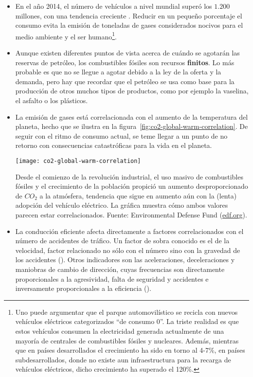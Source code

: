 \begin{itemize}
	\item En el año 2014, el número de vehículos a nivel mundial superó los $1.200$ millones, con una tendencia creciente \cite{oica2014motrate}. Reducir en un pequeño porcentaje el consumo evita la emisión de toneladas de gases considerados nocivos para el medio ambiente y el ser humano\footnote{Uno puede argumentar que el parque automovilístico se recicla con nuevos vehículos eléctricos categorizados \enquote{de consumo 0}. La triste realidad es que estos vehículos consumen la electricidad generada actualmente de una mayoría de centrales de combustibles fósiles y nucleares. Además, mientras que en países desarrollados el crecimiento ha sido en torno al 4-7\%, en países subdesarrollados, donde no existe aun infraestructura para la recarga de vehículos eléctricos, dicho crecimiento ha superado el 120\%.}.
	\item Aunque existen diferentes puntos de vista acerca de cuándo se agotarán las reservas de petróleo, los combustibles fósiles son recursos \textbf{finitos}. Lo más probable es que no se llegue a agotar debido a la ley de la oferta y la demanda, pero hay que recordar que el petróleo se usa como base para la producción de otros muchos tipos de productos, como por ejemplo la vaselina, el asfalto o los plásticos.
	\item La emisión de gases está correlacionada con el aumento de la temperatura del planeta, hecho que se ilustra en la figura~\ref{fig:co2-global-warm-correlation}. De seguir con el ritmo de consumo actual, se teme llegar a un punto de no retorno con consecuencias catastróficas para la vida en el planeta.

\begin{marginfigure}
	\centering
	\texttt{[image: co2-global-warm-correlation]}
	\caption[Relación entre la emisión de $CO_2$ a la atmósfera y el aumento de la temperatura en el planeta los últimos $1000$ años]{Desde el comienzo de la revolución industrial, el uso masivo de combustibles fósiles y el crecimiento de la población propició un aumento desproporcionado de $CO_2$ a la atmósfera, tendencia que sigue en aumento aún con la (lenta) adopción del vehículo eléctrico. La gráfica muestra cómo ambos valores parecen estar correlacionados. Fuente: Environmental Defense Fund (\url{edf.org}).}
	\label{fig:co2-global-warm-correlation}
\end{marginfigure}

	\item La conducción eficiente afecta directamente a factores correlacionados con el número de accidentes de tráfico. Un factor de sobra conocido es el de la velocidad, factor relacionado no sólo con el número sino con la gravedad de los accidentes (\cite{imprialou2016re}). Otros indicadores son las aceleraciones, deceleraciones y maniobras de cambio de dirección, cuyas frecuencias son directamente proporcionales a la agresividad, falta de seguridad y accidentes e inversamente proporcionales a la eficiencia (\cite{dingus2006100, lerner2010exploration}).
\end{itemize}

